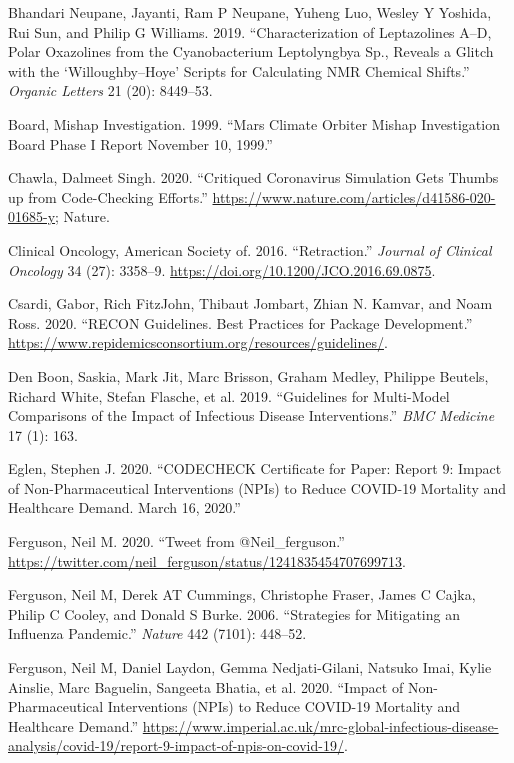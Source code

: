 \documentclass[
]{article}
\begin{document}
\leavevmode\hypertarget{ref-bhandari2019characterization}{}%
Bhandari Neupane, Jayanti, Ram P Neupane, Yuheng Luo, Wesley Y Yoshida, Rui Sun, and Philip G Williams. 2019. ``Characterization of Leptazolines A--D, Polar Oxazolines from the Cyanobacterium Leptolyngbya Sp., Reveals a Glitch with the `Willoughby--Hoye' Scripts for Calculating NMR Chemical Shifts.'' \emph{Organic Letters} 21 (20): 8449--53.

\leavevmode\hypertarget{ref-board1999mars}{}%
Board, Mishap Investigation. 1999. ``Mars Climate Orbiter Mishap Investigation Board Phase I Report November 10, 1999.''

\leavevmode\hypertarget{ref-ferg_pol}{}%
Chawla, Dalmeet Singh. 2020. ``Critiqued Coronavirus Simulation Gets Thumbs up from Code-Checking Efforts.'' \url{https://www.nature.com/articles/d41586-020-01685-y}; Nature.

\leavevmode\hypertarget{ref-retract}{}%
Clinical Oncology, American Society of. 2016. ``Retraction.'' \emph{Journal of Clinical Oncology} 34 (27): 3358--9. \url{https://doi.org/10.1200/JCO.2016.69.0875}.

\leavevmode\hypertarget{ref-RECON}{}%
Csardi, Gabor, Rich FitzJohn, Thibaut Jombart, Zhian N. Kamvar, and Noam Ross. 2020. ``RECON Guidelines. Best Practices for Package Development.'' \url{https://www.repidemicsconsortium.org/resources/guidelines/}.

\leavevmode\hypertarget{ref-den2019guidelines}{}%
Den Boon, Saskia, Mark Jit, Marc Brisson, Graham Medley, Philippe Beutels, Richard White, Stefan Flasche, et al. 2019. ``Guidelines for Multi-Model Comparisons of the Impact of Infectious Disease Interventions.'' \emph{BMC Medicine} 17 (1): 163.

\leavevmode\hypertarget{ref-ferg_check}{}%
Eglen, Stephen J. 2020. ``CODECHECK Certificate for Paper: Report 9: Impact of Non-Pharmaceutical Interventions (NPIs) to Reduce COVID-19 Mortality and Healthcare Demand. March 16, 2020.''

\leavevmode\hypertarget{ref-ferg_tweet}{}%
Ferguson, Neil M. 2020. ``Tweet from @Neil\_ferguson.'' \url{https://twitter.com/neil_ferguson/status/1241835454707699713}.

\leavevmode\hypertarget{ref-ferguson2006strategies}{}%
Ferguson, Neil M, Derek AT Cummings, Christophe Fraser, James C Cajka, Philip C Cooley, and Donald S Burke. 2006. ``Strategies for Mitigating an Influenza Pandemic.'' \emph{Nature} 442 (7101): 448--52.

\leavevmode\hypertarget{ref-imperial}{}%
Ferguson, Neil M, Daniel Laydon, Gemma Nedjati-Gilani, Natsuko Imai, Kylie Ainslie, Marc Baguelin, Sangeeta Bhatia, et al. 2020. ``Impact of Non-Pharmaceutical Interventions (NPIs) to Reduce COVID-19 Mortality and Healthcare Demand.'' \url{https://www.imperial.ac.uk/mrc-global-infectious-disease-analysis/covid-19/report-9-impact-of-npis-on-covid-19/}.
\end{document}
